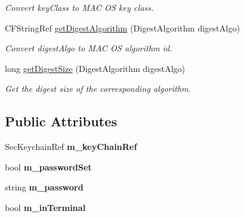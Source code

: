 \begin{DoxyCompactItemize}
\begin{DoxyCompactList}\small\item\em Convert key\+Class to M\+AC OS key class. \end{DoxyCompactList}\item 
C\+F\+String\+Ref \hyperlink{classndn_1_1SecTpmOsx_1_1Impl_a4040dceeb9303d528c3df1d6e1b2cc71}{get\+Digest\+Algorithm} (Digest\+Algorithm digest\+Algo)
\begin{DoxyCompactList}\small\item\em Convert digest\+Algo to M\+AC OS algorithm id. \end{DoxyCompactList}\item 
long \hyperlink{classndn_1_1SecTpmOsx_1_1Impl_ad4c3fa86a22a829b3e984a4af770695e}{get\+Digest\+Size} (Digest\+Algorithm digest\+Algo)
\begin{DoxyCompactList}\small\item\em Get the digest size of the corresponding algorithm. \end{DoxyCompactList}\end{DoxyCompactItemize}
\subsection*{Public Attributes}
\begin{DoxyCompactItemize}
\item 
Sec\+Keychain\+Ref {\bfseries m\+\_\+key\+Chain\+Ref}\hypertarget{classndn_1_1SecTpmOsx_1_1Impl_ac110b1c3c8e624c3948b17fd3baf1831}{}\label{classndn_1_1SecTpmOsx_1_1Impl_ac110b1c3c8e624c3948b17fd3baf1831}

\item 
bool {\bfseries m\+\_\+password\+Set}\hypertarget{classndn_1_1SecTpmOsx_1_1Impl_a9cd84747aef36689fd71b7e938e77158}{}\label{classndn_1_1SecTpmOsx_1_1Impl_a9cd84747aef36689fd71b7e938e77158}

\item 
string {\bfseries m\+\_\+password}\hypertarget{classndn_1_1SecTpmOsx_1_1Impl_a1a5d209d24e09f3ff495218f6b11dc6d}{}\label{classndn_1_1SecTpmOsx_1_1Impl_a1a5d209d24e09f3ff495218f6b11dc6d}

\item 
bool {\bfseries m\+\_\+in\+Terminal}\hypertarget{classndn_1_1SecTpmOsx_1_1Impl_acb9ee534075c9c9a1b83be928b8deea2}{}\label{classndn_1_1SecTpmOsx_1_1Impl_acb9ee534075c9c9a1b83be928b8deea2}

\end{DoxyCompactItemize}


